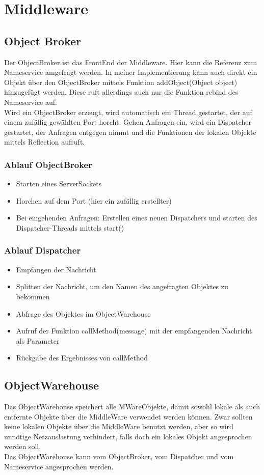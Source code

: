 \section{Middleware}

\subsection{Object Broker}
Der ObjectBroker ist das FrontEnd der Middleware. Hier kann die Referenz zum Nameservice amgefragt werden. In meiner Implementierung kann auch direkt ein Objekt über den ObjectBroker mittels Funktion addObject(Object object) hinzugefügt werden. Diese ruft allerdings auch nur die Funktion rebind des Nameservice auf.\\
Wird ein ObjectBroker erzeugt, wird automatisch ein Thread gestartet, der auf einem zufällig gewählten Port horcht. Gehen Anfragen ein, wird ein Dispatcher gestartet, der Anfragen entgegen nimmt und die Funktionen der lokalen Objekte mittels Reflection aufruft.

\subsubsection{Ablauf ObjectBroker}
\begin{itemize}
\item Starten eines ServerSockets
\item Horchen auf dem Port (hier ein zufällig erstellter)
\item Bei eingehenden Anfragen: Erstellen eines neuen Dispatchers und starten des Dispatcher-Threads mittels start()
\end{itemize}

\subsubsection{Ablauf Dispatcher}
\begin{itemize}
\item Empfangen der Nachricht
\item Splitten der Nachricht, um den Namen des angefragten Objektes zu bekommen
\item Abfrage des Objektes im ObjectWarehouse
\item Aufruf der Funktion callMethod(message) mit der empfangenden Nachricht als Parameter
\item Rückgabe des Ergebnisses von callMethod 
\end{itemize}

\subsection{ObjectWarehouse}
Das ObjectWarehouse speichert alle MWareObjekte, damit sowohl lokale als auch entfernte Objekte über die MiddleWare verwendet werden können. Zwar sollten keine lokalen Objekte über die MiddleWare benutzt werden, aber so wird unnötige Netzauslastung verhindert, falls doch ein lokales Objekt angesprochen werden soll.\\
Das ObjectWarehouse kann vom ObjectBroker, vom Dispatcher und vom Nameservice angesprochen werden.


